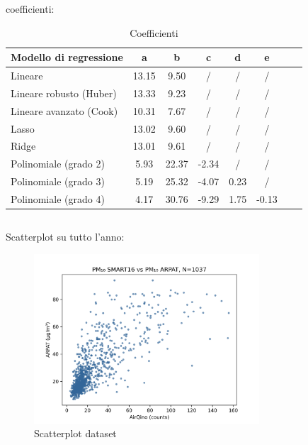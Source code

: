 coefficienti:

\begin{table}[H]
    \footnotesize
    \centering
    \begin{tabular}{|l|c|c|c|c|c|c|c|}
    \hline
        \textbf{Modello di regressione} & \textbf{a} & \textbf{b} & \textbf{c} & \textbf{d} & \textbf{e} \\ \hline
        Lineare & 13.15 & 9.50 & / & / & / \\ \hline
        Lineare robusto (Huber) & 13.33 & 9.23 & / & / & / \\ \hline
        Lineare avanzato (Cook) & 10.31 & 7.67 & / & / & / \\ \hline
        Lasso & 13.02 & 9.60 & / & / & / \\ \hline
        Ridge & 13.01 & 9.61 & / & / & / \\ \hline
        Polinomiale (grado 2) & 5.93 & 22.37 & -2.34 & / & / \\ \hline
        Polinomiale (grado 3) & 5.19 & 25.32 & -4.07 & 0.23 & / \\ \hline
        Polinomiale (grado 4) & 4.17 & 30.76 & -9.29 & 1.75 & -0.13 \\ \hline
    \end{tabular}
    \caption{Coefficienti}
    \label{fig:risultati-pm2.5-coefficienti}
\end{table}


\subsection{}\label{ssec:risultati-pm10}

Scatterplot su tutto l'anno:
\begin{figure}[H]
\centering
\includegraphics[width=0.75\textwidth,height=\textheight,keepaspectratio]{img/sc_pm10.png}
\caption{Scatterplot dataset }
\label{fig:scatterplot_pm10}
\end{figure}

